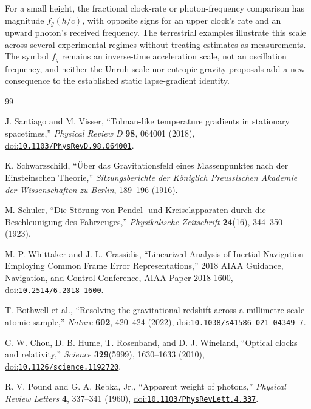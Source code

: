 \documentclass[12pt]{article}
\begin{document}
For a small height, the fractional clock-rate or photon-frequency comparison has magnitude $f_g(h/c)$, with opposite signs for an upper clock's rate and an upward photon's received frequency. The terrestrial examples illustrate this scale across several experimental regimes without treating estimates as measurements. The symbol $f_g$ remains an inverse-time acceleration scale, not an oscillation frequency, and neither the Unruh scale nor entropic-gravity proposals add a new consequence to the established static lapse-gradient identity.

\begin{thebibliography}{99}
\small
{}
\raggedright
{}

J. Santiago and M. Visser,
``Tolman-like temperature gradients in stationary spacetimes,''
\emph{Physical Review D} \textbf{98}, 064001 (2018),
\href{https://doi.org/10.1103/PhysRevD.98.064001}{doi:\nolinkurl{10.1103/PhysRevD.98.064001}}.

K. Schwarzschild,
``\"Uber das Gravitationsfeld eines Massenpunktes nach der Einsteinschen Theorie,''
\emph{Sitzungsberichte der K\"oniglich Preussischen Akademie der Wissenschaften zu Berlin}, 189--196 (1916).

M. Schuler,
``Die St\"orung von Pendel- und Kreiselapparaten durch die Beschleunigung des Fahrzeuges,''
\emph{Physikalische Zeitschrift} \textbf{24}(16), 344--350 (1923).

M. P. Whittaker and J. L. Crassidis,
``Linearized Analysis of Inertial Navigation Employing Common Frame Error Representations,''
2018 AIAA Guidance, Navigation, and Control Conference,
AIAA Paper 2018-1600,
\href{https://doi.org/10.2514/6.2018-1600}{doi:\nolinkurl{10.2514/6.2018-1600}}.

T. Bothwell et al.,
``Resolving the gravitational redshift across a millimetre-scale atomic sample,''
\emph{Nature} \textbf{602}, 420--424 (2022),
\href{https://doi.org/10.1038/s41586-021-04349-7}{doi:\nolinkurl{10.1038/s41586-021-04349-7}}.

C. W. Chou, D. B. Hume, T. Rosenband, and D. J. Wineland,
``Optical clocks and relativity,''
\emph{Science} \textbf{329}(5999), 1630--1633 (2010),
\href{https://doi.org/10.1126/science.1192720}{doi:\nolinkurl{10.1126/science.1192720}}.

R. V. Pound and G. A. Rebka, Jr.,
``Apparent weight of photons,''
\emph{Physical Review Letters} \textbf{4}, 337--341 (1960),
\href{https://doi.org/10.1103/PhysRevLett.4.337}{doi:\nolinkurl{10.1103/PhysRevLett.4.337}}.


\end{thebibliography}
\end{document}
